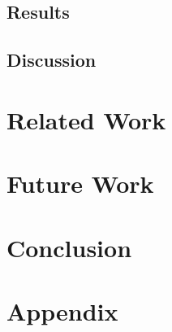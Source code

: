 \documentclass[a4paper,11pt]{article}
\begin{document}
\subsection{Results}


\subsection{Discussion}



\section{Related Work}


\section{Future Work}


\section{Conclusion}


\section{Appendix}

\end{document}
